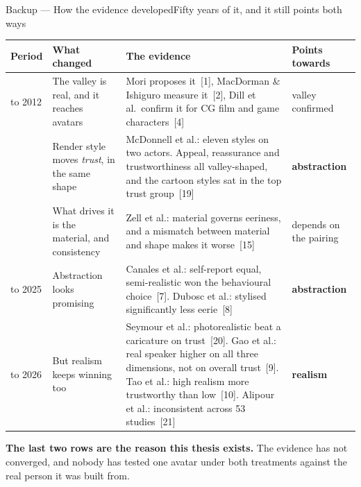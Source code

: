 \documentclass[aspectratio=169,10pt]{beamer}
\newcommand{\hl}[1]{{\color{knblue}\textbf{#1}}}
\newcommand{\bad}[1]{{\color{knred}\textbf{#1}}}
\begin{document}

\begin{frame}{Backup — How the evidence developed}{Fifty years of it, and it still points both ways}
  \vspace{0.3em}
  \begin{center}
  \scriptsize
  \setlength{\tabcolsep}{5pt}\renewcommand{\arraystretch}{1.12}
  \begin{tabular}{@{}>{\raggedright\arraybackslash}p{}>{\raggedright\arraybackslash}p{}>{\raggedright\arraybackslash}p{}>{\raggedright\arraybackslash}p{}@{}}
    \toprule
    \textbf{Period} & \textbf{What changed} & \textbf{The evidence} & \textbf{Points towards} \\
    \midrule
    1970\newline to 2012 & The valley is real, and it reaches avatars
      & Mori proposes it~[1], MacDorman \& Ishiguro measure it~[2], Dill et al.\ confirm it for CG film and game characters~[4]
      & {\color{kngrey}valley confirmed} \\
    2012 & Render style moves \emph{trust}, in the same shape
      & McDonnell et al.: eleven styles on two actors. Appeal, reassurance and trustworthiness all valley-shaped, and the cartoon styles sat in the top trust group~[19]
      & \hl{abstraction} \\
    2015 & What drives it is the material, and consistency
      & Zell et al.: material governs eeriness, and a mismatch between material and shape makes it worse~[15]
      & {\color{kngrey}depends on the pairing} \\
    2024\newline to 2025 & Abstraction looks promising
      & Canales et al.: self-report equal, semi-realistic won the behavioural choice~[7]. Dubosc et al.: stylised significantly less eerie~[8]
      & \hl{abstraction} \\
    2021\newline to 2026 & But realism keeps winning too
      & Seymour et al.: photorealistic beat a caricature on trust~[20]. Gao et al.: real speaker higher on all three dimensions, not on overall trust~[9]. Tao et al.: high realism more trustworthy than low~[10]. Alipour et al.: inconsistent across 53 studies~[21]
      & \bad{realism} \\
    \bottomrule
  \end{tabular}
  \end{center}
  \vspace{-0.1em}
  \noindent\colorbox{knlight}{\parbox{0.975\textwidth}{\scriptsize\color{knblue}
  \textbf{The last two rows are the reason this thesis exists.} The evidence has not converged, and nobody has tested one avatar under both treatments against the real person it was built from.}}
\end{frame}
\end{document}
